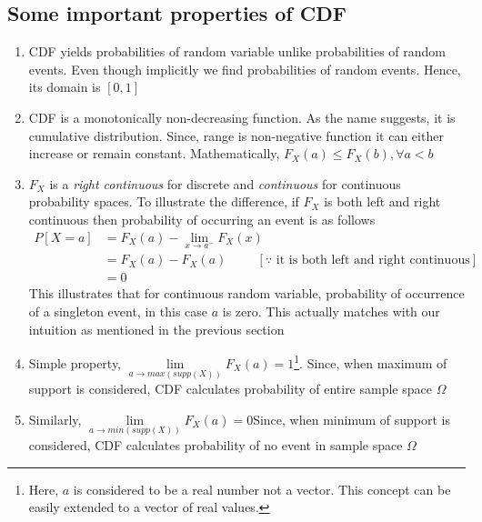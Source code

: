 \documentclass[12pt]{report} %
\begin{document}
	\begin{center}
		\section*{Some important properties of CDF}
	\end{center}
	\begin{enumerate}
		\item CDF yields probabilities of random variable unlike probabilities of random events. Even though implicitly we find probabilities of random events. Hence, its domain is $[0,1]$
		\item CDF is a monotonically non-decreasing function. As the name suggests, it is cumulative distribution. Since, range is non-negative function it can either increase or remain constant. Mathematically, $F_X(a) \leq F_X(b), \forall a < b  $
		\item $F_X$ is a \textit{right continuous} for discrete and \textit{continuous} for continuous probability spaces. To illustrate the difference, if $F_X$ is both left and right continuous then probability of occurring an event is as follows
		\begin{equation}
		\begin{aligned}
			P[X = a] &= F_X(a) - \lim\limits_{x \rightarrow a^{-}}F_X(x)\\
			&= F_X(a) - F_X(a)  \hspace{1cm}[\because \text{ it  is both left  and  right  continuous}] \\
			&= 0
		\end{aligned}
		\end{equation}
		This illustrates that for continuous random variable, probability of occurrence of a singleton event, in this case $a$ is zero. This actually matches with our intuition as mentioned in the previous section
		\item Simple property, $\lim\limits_{a \rightarrow max(supp(X))}F_X(a) = 1$\footnote{\label{note1}Here, $a$ is considered to be a real number not a vector. This concept can be easily extended to a vector of real values. }. Since, when maximum of support is considered, CDF calculates probability of entire sample space $\Omega$
		\item Similarly, \hspace{1.3cm}$\lim\limits_{a \rightarrow min(supp(X))}F_X(a) = 0$\footnotemark[\ref{note1}] Since, when minimum of support is considered, CDF calculates probability of no event in sample space $\Omega$
	\end{enumerate}
	
\end{document}
